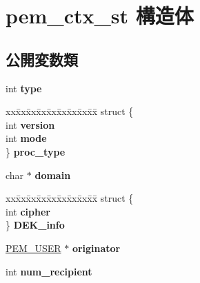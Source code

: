 \hypertarget{structpem__ctx__st}{}\section{pem\+\_\+ctx\+\_\+st 構造体}
\label{structpem__ctx__st}
\subsection*{公開変数類}
\begin{DoxyCompactItemize}
\item 
\hypertarget{structpem__ctx__st_aa68441b2d1bdccccc8b598a582b42793}{}int {\bfseries type}\label{structpem__ctx__st_aa68441b2d1bdccccc8b598a582b42793}

\item 
\hypertarget{structpem__ctx__st_a79cbba42a4b57847341be3d6210cc404}{}\begin{tabbing}
xx\=xx\=xx\=xx\=xx\=xx\=xx\=xx\=xx\=\kill
struct \{\\
\>int {\bfseries version}\\
\>int {\bfseries mode}\\
\} {\bfseries proc\_type}\label{structpem__ctx__st_a79cbba42a4b57847341be3d6210cc404}
\\

\end{tabbing}\item 
\hypertarget{structpem__ctx__st_a626b9c364cf296248d6106e728923e45}{}char $\ast$ {\bfseries domain}\label{structpem__ctx__st_a626b9c364cf296248d6106e728923e45}

\item 
\hypertarget{structpem__ctx__st_a53ceed4fc5e408b8c6856be78df50789}{}\begin{tabbing}
xx\=xx\=xx\=xx\=xx\=xx\=xx\=xx\=xx\=\kill
struct \{\\
\>int {\bfseries cipher}\\
\} {\bfseries DEK\_info}\label{structpem__ctx__st_a53ceed4fc5e408b8c6856be78df50789}
\\

\end{tabbing}\item 
\hypertarget{structpem__ctx__st_af7c7d2c215c91227ee7f1480af2d33df}{}\hyperlink{structpem__recip__st}{P\+E\+M\+\_\+\+U\+S\+E\+R} $\ast$ {\bfseries originator}\label{structpem__ctx__st_af7c7d2c215c91227ee7f1480af2d33df}

\item 
\hypertarget{structpem__ctx__st_a0efb31608f13a8faf991385d6bd9d788}{}int {\bfseries num\+\_\+recipient}\label{structpem__ctx__st_a0efb31608f13a8faf991385d6bd9d788}


\end{DoxyCompactItemize}
